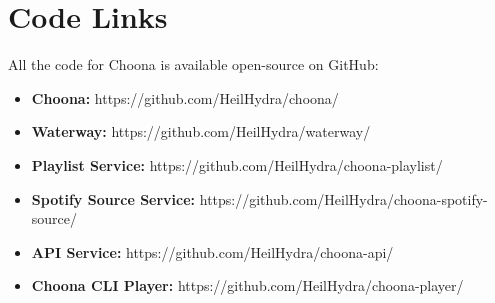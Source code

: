\section{Code Links}

All the code for Choona is available open-source on GitHub:

\begin{itemize}
  \item \textbf{Choona:} https://github.com/HeilHydra/choona/
  \item \textbf{Waterway:} https://github.com/HeilHydra/waterway/
  \item \textbf{Playlist Service:} https://github.com/HeilHydra/choona-playlist/
  \item \textbf{Spotify Source Service:} https://github.com/HeilHydra/choona-spotify-source/
  \item \textbf{API Service:} https://github.com/HeilHydra/choona-api/
  \item \textbf{Choona CLI Player:} https://github.com/HeilHydra/choona-player/
\end{itemize}